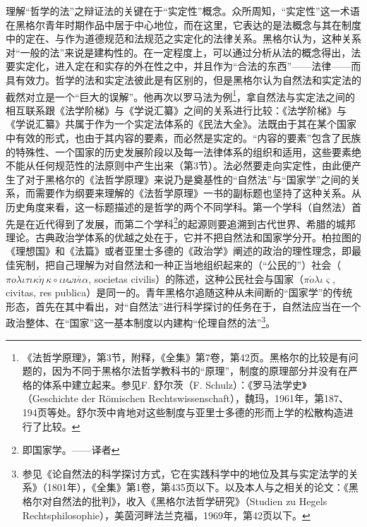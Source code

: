 理解“哲学的法”之辩证法的关键在于“实定性”概念。众所周知，“实定性”这一术语在黑格尔青年时期作品中居于中心地位，而在这里，它表达的是法概念与其在制度中的定在、与作为道德规范和法规范之实定化的法律关系。黑格尔认为，这种关系对“一般的法”来说是建构性的。在一定程度上，可以通过分析从法的概念得出，法要实定化，进入定在和实存的外在性之中，并且作为“合法的东西”——法律——而具有效力。哲学的法和实定法彼此是有区别的，但是黑格尔认为自然法和实定法的截然对立是一个“巨大的误解”。他再次以罗马法为例\footnote{《法哲学原理》，第3节，附释，《全集》第7卷，第42页。黑格尔的比较是有问题的，因为不同于黑格尔法哲学教科书的“原理”，制度的原理部分并没有在严格的体系中建立起来。参见F. 舒尔茨（F. Schulz）：《罗马法学史》（Geschichte der Römischen Rechtswissenschaft），魏玛，1961年，第187、194页等处。舒尔茨中肯地对这些制度与亚里士多德的形而上学的松散构造进行了比较。}，拿自然法与实定法之间的相互联系跟《法学阶梯》与《学说汇纂》之间的关系进行比较：《法学阶梯》与《学说汇纂》共属于作为一个实定法体系的《民法大全》。法既由于其在某个国家中有效的形式，也由于其内容的要素，而必然是实定的。“内容的要素”包含了民族的特殊性、一个国家的历史发展阶段以及每一法律体系的组织和适用，这些要素绝不能从任何规范性的法原则中产生出来（第3节）。法必然要走向实定性，由此便产生了对于黑格尔的《法哲学原理》来说乃是奠基性的“自然法”与“国家学”之间的关系，而需要作为纲要来理解的《法哲学原理》一书的副标题也坚持了这种关系。从历史角度来看，这一标题描述的是哲学的两个不同学科。第一个学科（自然法）首先是在近代得到了发展，而第二个学科\footnote{即国家学。——译者}的起源则要追溯到古代世界、希腊的城邦理论。古典政治学体系的优越之处在于，它并不把自然法和国家学分开。柏拉图的《理想国》和《法篇》或者亚里士多德的《政治学》阐述的政治的理性理念，即最佳宪制，把自己理解为对自然法和一种正当地组织起来的（“公民的”）社会（$\pi o \lambda \iota \tau \iota \kappa \acute{\eta}\ \kappa \circ \iota \nu \omega \nu \acute{\iota} \alpha$, societas civilis）的陈述，这种公民社会与国家（$\pi \acute{o} \lambda \iota \varsigma$, civitas, res publica）是同一的。青年黑格尔追随这种从未间断的“国家学”的传统形态，首先在其中看出，对“自然法”进行科学探讨的任务在于，自然法应当在一个政治整体、在“国家”这一基本制度以内建构“伦理自然的法”\footnote{参见《论自然法的科学探讨方式，它在实践科学中的地位及其与实定法学的关系》（1801年），《全集》第1卷，第435页以下。以及本人与之相关的论文：《黑格尔对自然法的批判》，收入《黑格尔法哲学研究》（Studien zu Hegels Rechtsphilosophie），美茵河畔法兰克福，1969年，第42页以下。}。

